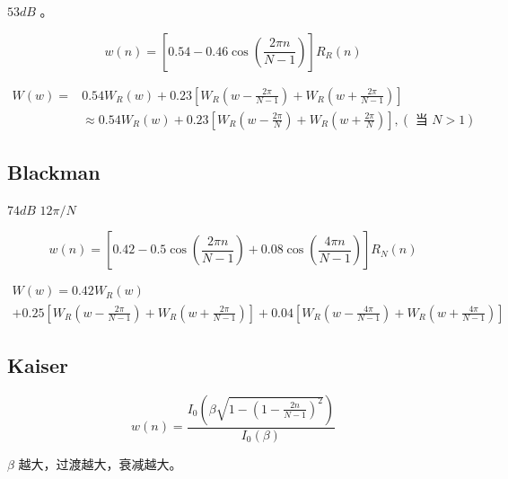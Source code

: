 \documentclass[cn,11pt,chinese,black,simple]{elegantbook}
\begin{document}
\(53 dB\) 。

\[
w(n)=\left[0.54-0.46 \cos \left(\frac{2 \pi n}{N-1}\right)\right] R_{R}(n)
\]

\[
\begin{aligned}
W(w)=& 0.54 W_{R}(w)+0.23\left[W_{R}\left(w-\frac{2 \pi}{N-1}\right)+W_{R}\left(w+\frac{2 \pi}{N-1}\right)\right] \\
& \approx 0.54 W_{R}(w)+0.23\left[W_{R}\left(w-\frac{2 \pi}{N}\right)+W_{R}\left(w+\frac{2 \pi}{N}\right)\right],(\text { 当 } N>1)
\end{aligned}
\]

\subsection{Blackman}

\(74 dB\)  \(12 \pi / N\) 

\[
w(n)=\left[0.42-0.5 \cos \left(\frac{2 \pi n}{N-1}\right)+0.08 \cos \left(\frac{4 \pi n}{N-1}\right)\right] R_{N}(n)
\]

\[
\begin{array}{l}
W(w)=0.42 W_{R}(w) \\
+0.25\left[W_{R}\left(w-\frac{2 \pi}{N-1}\right)+W_{R}\left(w+\frac{2 \pi}{N-1}\right)\right]+0.04\left[W_{R}\left(w-\frac{4 \pi}{N-1}\right)+W_{R}\left(w+\frac{4 \pi}{N-1}\right)\right]
\end{array}
\]

\subsection{Kaiser}

\[
w(n)=\frac{I_{0}\left(\beta \sqrt{1-\left(1-\frac{2 n}{N-1}\right)^{2}}\right)}{I_{0}(\beta)}
\]

\(\beta\) 越大，过渡越大，衰减越大。




\let\chapname\undefined
\ifx\mainclass\undefined
\end{document}
